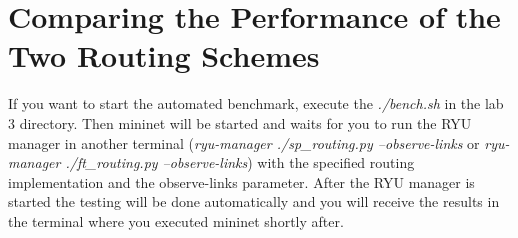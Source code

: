 \documentclass[a4paper,11pt]{article}
\newcommand{\note}[1]{\textit{\textcolor{gray}{#1}}}
\begin{document}
\section{Comparing the Performance of the Two Routing Schemes}


If you want to start the automated benchmark, execute the \emph{./bench.sh} in the lab 3 directory.
Then mininet will be started and waits for you to run the RYU manager in another terminal (\emph{ryu-manager ./sp\_routing.py --observe-links} or \emph{ryu-manager ./ft\_routing.py --observe-links}) with the specified routing implementation and the observe-links parameter.
After the RYU manager is started the testing will be done automatically and you will receive the results in the terminal where you executed mininet shortly after.
\end{document}
